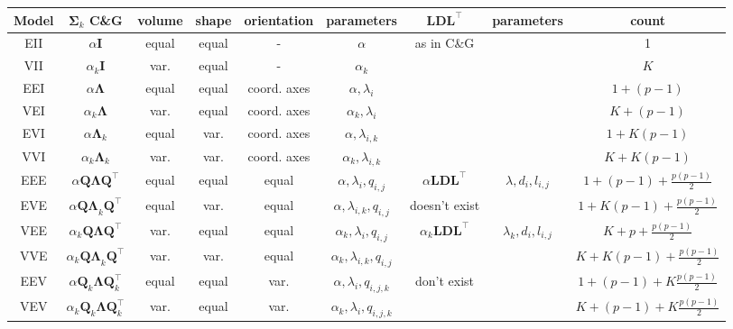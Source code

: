 \begin{table}[!htb]
    \centering
{}
{
    \begin{tabular}{| c | c c c c c | c c c |}
        \hline
        Model & $\pmb{\Sigma}_k$ C\&G & volume & shape & orientation & parameters & $ \pmb{LDL}^\top $ & parameters & count \\
        \hline

        EII    & $ \alpha \pmb{I} $ & equal & equal & - & $ \alpha $ & as in C\&G & & 1 \\
        VII    & $ \alpha_k \pmb{I} $         & var. & equal & - & $ \alpha_k $ & & & $K$  \\
        EEI    & $ \alpha \pmb{\Lambda} $     & equal & equal & coord. axes & $ \alpha, \lambda_i $ & & & $ 1+(p-1) $\\
        VEI    & $ \alpha_k \pmb{\Lambda} $ & var. & equal & coord. axes & $ \alpha_k, \lambda_{i}$ & & & $ K+(p-1) $ \\
        EVI    & $ \alpha \pmb{\Lambda}_k $ &equal & var. & coord. axes & $ \alpha, \lambda_{i,k} $ & & & $ 1+K(p-1) $ \\
        VVI    & $ \alpha_k \pmb{\Lambda}_k $ & var. & var. & coord. axes & $ \alpha_k, \lambda_{i,k} $ & & & $ K+K(p-1) $ \\
        \hline
        EEE    & $ \alpha \pmb{Q \Lambda Q}^\top $ &equal & equal & equal & $ \alpha, \lambda_{i}, q_{i,j} $ & $ \alpha \pmb{LDL}^{\top} $ & $ \lambda , d_i, l_{i,j} $ & $ 1+(p-1)+\frac{p(p-1)}{2} $ \\
        \hline
        EVE    & $ \alpha \pmb{Q \Lambda}_k \pmb{Q}^\top $ &equal & var. & equal & $ \alpha, \lambda_{i,k}, q_{i,j} $  & doesn't exist & & $ 1+K(p-1)+\frac{p(p-1)}{2} $ \\
        \hline
        VEE    & $ \alpha_k \pmb{Q \Lambda Q}^\top $ & var. & equal & equal & $ \alpha_k, \lambda_{i}, q_{i,j} $ & $ \alpha_k \pmb{LDL}^\top $ & $ \lambda_k , d_i, l_{i,j} $ & $ K+p+\frac{p(p-1)}{2} $ \\
        \hline
        VVE    & $ \alpha_k \pmb{Q \Lambda}_k \pmb{Q}^\top $ &var. & var. & equal & $ \alpha_k, \lambda_{i,k}, q_{i,j} $ & & & $ K+K(p-1)+\frac{p(p-1)}{2} $ \\
        EEV    & $ \alpha \pmb{Q}_k \pmb{\Lambda} \pmb{Q}_k^\top $ &equal & equal & var. & $ \alpha, \lambda_{i}, q_{i,j,k} $ &  don't exist  & & $ 1+(p-1)+K\frac{p(p-1)}{2} $ \\
        VEV    & $ \alpha_k \pmb{Q}_k \pmb{\Lambda} \pmb{Q}_k^\top $ &var. & equal & var. & $ \alpha_k, \lambda_{i}, q_{i,j,k} $ & & & $ K+(p-1)+K\frac{p(p-1)}{2} $ \\

\end{tabular}}
\end{table}
